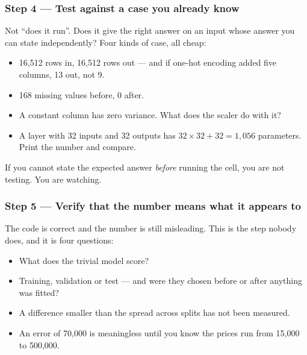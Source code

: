 \documentclass[11pt,a4paper]{article}
\begin{document}
\subsubsection{Step 4 --- Test against a case you already know}

Not ``does it run''. Does it give the right answer on an input whose answer you
can state independently? Four kinds of case, all cheap:

\begin{itemize}[leftmargin=1.4em,itemsep=2pt]
  \item {} 16{,}512 rows in, 16{,}512 rows out --- and if one-hot
        encoding added five columns, 13 out, not 9.
  \item {} 168 missing values before, 0 after.
  \item {} A constant column has zero variance. What
        does the scaler do with it?
  \item {} A layer with 32 inputs and 32
        outputs has $32 \times 32 + 32 = 1{,}056$ parameters. Print the number
        and compare.
\end{itemize}

\begin{failbox}[title={The rule that separates testing from watching}]
If you cannot state the expected answer \emph{before} running the cell, you are
not testing. You are watching.
\end{failbox}

\subsubsection{Step 5 --- Verify that the number means what it appears to}

The code is correct and the number is still misleading. This is the step nobody
does, and it is four questions:

\begin{itemize}[leftmargin=1.4em,itemsep=2pt]
  \item {} What does the trivial model score?
  \item {} Training, validation or test --- and were they
        chosen before or after anything was fitted?
  \item {} A difference smaller than the spread
        across splits has not been measured.
  \item {} An error of 70{,}000 is meaningless until you
        know the prices run from 15{,}000 to 500{,}000.
\end{itemize}
\end{document}
